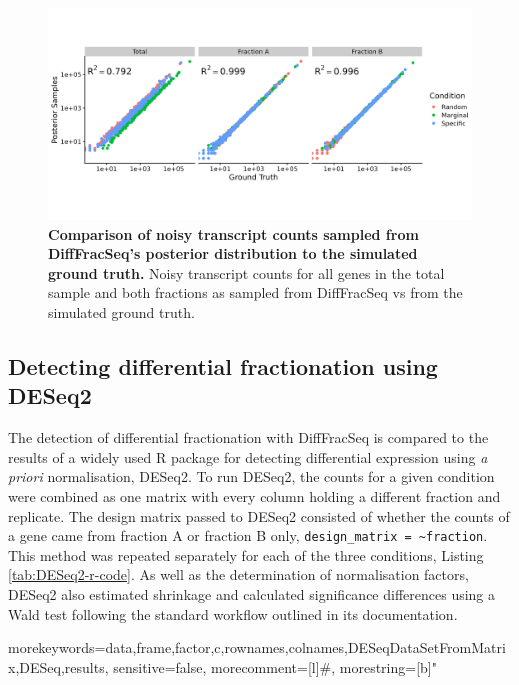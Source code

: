 \documentclass[../main.tex]{subfiles}
\begin{document}
\begin{figure}

{\centering \includegraphics[width=\linewidth]{figures/bayesian_posterior_vs_GT_counts.png} 

}

\caption[DiffFracSeq posterior predictive check]{\textbf{Comparison of noisy transcript counts sampled from DiffFracSeq's posterior distribution to the simulated ground truth.} Noisy transcript counts for all genes in the total sample and both fractions as sampled from DiffFracSeq vs from the simulated ground truth.} \label{fig:simulated-posterior-check}
\end{figure}

\subsection{Detecting differential fractionation using DESeq2}

The detection of differential fractionation with DiffFracSeq is compared to the results of a widely used R package for detecting differential expression using \textit{a priori} normalisation, DESeq2.
To run DESeq2, the counts for a given condition were combined as one matrix with every column holding a different fraction and replicate. 
The design matrix passed to DESeq2 consisted of whether the counts of a gene came from fraction A or fraction B only, \lstinline{design_matrix = ~fraction}.
This method was repeated separately for each of the three conditions, Listing \ref{tab:DESeq2-r-code}.
As well as the determination of normalisation factors, DESeq2 also estimated shrinkage and calculated significance differences using a Wald test following the standard workflow outlined in its documentation. 

{morekeywords={data,frame,factor,c,rownames,colnames,DESeqDataSetFromMatrix,DESeq,results},
sensitive=false,
morecomment=[l]#,
morestring=[b]"}
\end{document}
